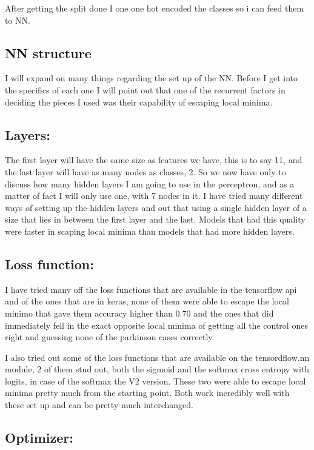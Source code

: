 \documentclass{article} %
\begin{document}
After getting the split done I one one hot encoded the classes so i can feed them to NN.

\subsection{NN structure}

I will expand on many things regarding the set up of the NN. Before I get into the specifics of each one I will point out that one of the recurrent factors in deciding the pieces I used was their capability of escaping local minima.

\subsection*{Layers:}

The first layer will have the same size as features we have, this is to say 11, and the last layer will have as many nodes as classes, 2. So we now have only to discuss how many hidden layers I am going to use in the perceptron, and as a matter of fact I will only use one, with 7 nodes in it. I have tried many different ways of setting up the hidden layers and out that using a single hidden layer of a size that lies in between the first layer and the last. Models that had this quality were faster in scaping local minima than models that had more hidden layers.
\bigskip
\subsection*{Loss function:}

I have tried many off the loss functions that are available in the tensorflow api and of the ones that are in keras, none of them were able to escape the local minimo that gave them accuracy higher than 0.70 and the ones that did immediately fell in the exact opposite local minima of getting all the control ones right and guessing none of the parkinson cases correctly.

I also tried out some of the loss functions that are available on the tensordflow.nn module, 2 of them stud out, both the sigmoid and the softmax cross entropy with logits, in case of the softmax the V2 version. These two were able to escape local minima pretty much from the starting point. Both work incredibly well with these set up and can be pretty much interchanged.

\subsection*{Optimizer:}
\end{document}
